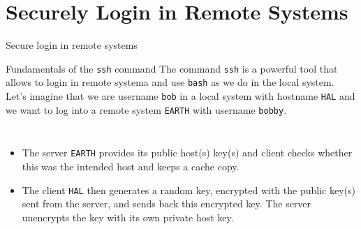 \section{Securely Login in Remote Systems}
\begin{frame}[t,fragile]{Secure login in remote systems}
  \begin{block}{Fundamentals of the \alert{\texttt{ssh}} command}
    {\footnotesize
      The command \alert{\texttt{ssh}} is a powerful tool that allows to login in  remote systema and use \texttt{bash} as we do in the local system.  Let's imagine that we are username \texttt{\alert{bob}} in a local system with hostname \texttt{\alert{HAL}} and we want to log into a remote system \texttt{\alert{EARTH}} with username \texttt{\alert{bobby}}. 
    }
    \vspace{0.2cm}
    \begin{columns}
    
      {\scriptsize
        \begin{itemize}
          \item The server \texttt{\alert{EARTH}} provides its \alert{public} host(s) key(s) and client checks whether this was the intended host and keeps a cache copy.
        
        \item The client \texttt{\alert{HAL}} then generates a \alert{random key}, encrypted with  the public key(s) sent from the server, and sends back this encrypted key. The server unencrypts the key with its own private host key.


\end{itemize}}
\end{columns}
\end{block}
\end{frame}
